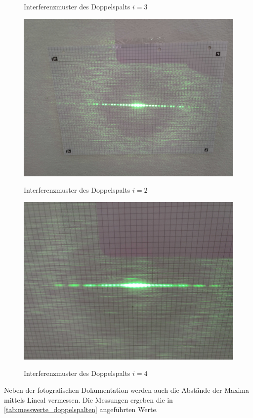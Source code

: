 \documentclass[ngerman]{scrartcl}
\begin{document}
\begin{figure}[H]
\begin{minipage}[t]{0.45\linewidth}
        \caption{Interferenzmuster des Doppelspalts $i = 3$}
        \label{fig:DS_3_interferenzmuster}
    \end{minipage}%
    \hspace*{\fill}
    \begin{minipage}[t]{0.45\linewidth}
        \centering
        \includegraphics[width=\linewidth]{fig/Compressed/DS2_0_10_25.jpg}
        \caption{Interferenzmuster des Doppelspalts $i = 2$}
        \label{fig:DS_2_interferenzmuster}
        \includegraphics[width=\linewidth]{fig/Compressed/DS4_0_11.jpg}
        \caption{Interferenzmuster des Doppelspalts $i = 4$}
        \label{fig:DS_4_interferenzmuster}
    \end{minipage}
\end{figure}
\setcaphanging
%
Neben der fotografischen Dokumentation werden auch die Abstände der Maxima mittels Lineal vermessen. Die Messungen ergeben die in \autoref{tab:messwerte_doppelspalten} angeführten Werte.
\end{document}
